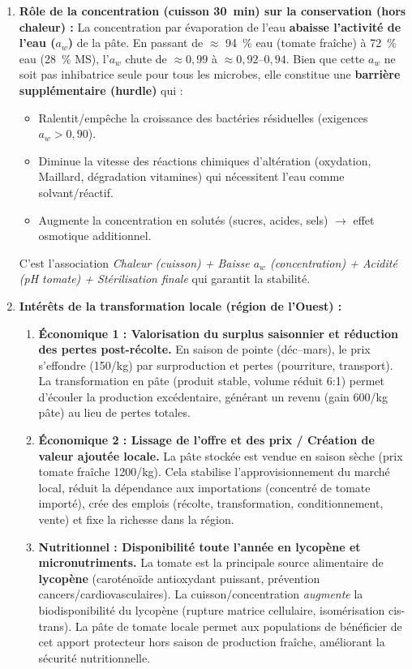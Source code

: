 \documentclass[11pt]{article}
\newcommand{\cle}[1]{{\popxbold\color{popdark}#1}}
\begin{document}
\begin{corrige}
\begin{enumerate}
\item \textbf{Rôle de la concentration (cuisson \SI{30}{\minute}) sur la conservation (hors chaleur) :}
La concentration par évaporation de l'eau \textbf{abaisse l'activité de l'eau ($a_w$)} de la pâte. En passant de $\approx$ \SI{94}{\%} eau (tomate fraîche) à \SI{72}{\%} eau (\SI{28}{\%} MS), l'$a_w$ chute de $\approx 0,99$ à $\approx 0,92\text{--}0,94$. Bien que cette $a_w$ ne soit pas inhibatrice seule pour tous les microbes, elle constitue une \textbf{barrière supplémentaire (hurdle)} qui :
\begin{itemize}
\item Ralentit/empêche la croissance des bactéries résiduelles (exigences $a_w > 0,90$).
\item Diminue la vitesse des réactions chimiques d'altération (oxydation, Maillard, dégradation vitamines) qui nécessitent l'eau comme solvant/réactif.
\item Augmente la concentration en solutés (sucres, acides, sels) $\to$ effet osmotique additionnel.
\end{itemize}
C'est l'association \emph{Chaleur (cuisson) + Baisse $a_w$ (concentration) + Acidité (pH tomate) + Stérilisation finale} qui garantit la stabilité.

\item \textbf{Intérêts de la transformation locale (région de l'Ouest) :}
\begin{enumerate}
\item \textbf{Économique 1 : Valorisation du surplus saisonnier et réduction des pertes post-récolte.} En saison de pointe (déc--mars), le prix s'effondre (\SI{150}{\FCFA}/\si{\kg}) par surproduction et pertes (pourriture, transport). La transformation en pâte (produit stable, volume réduit 6:1) permet d'écouler la production excédentaire, générant un revenu (gain \SI{600}{\FCFA}/\si{\kg} pâte) au lieu de pertes totales.
\item \textbf{Économique 2 : Lissage de l'offre et des prix / Création de valeur ajoutée locale.} La pâte stockée est vendue en saison sèche (prix tomate fraîche \SI{1200}{\FCFA}/\si{\kg}). Cela stabilise l'approvisionnement du marché local, réduit la dépendance aux importations (concentré de tomate importé), crée des emplois (récolte, transformation, conditionnement, vente) et fixe la richesse dans la région.
\item \textbf{Nutritionnel : Disponibilité toute l'année en \cle{lycopène} et micronutriments.} La tomate est la principale source alimentaire de \textbf{lycopène} (caroténoïde antioxydant puissant, prévention cancers/cardiovasculaires). La cuisson/concentration \emph{augmente} la biodisponibilité du lycopène (rupture matrice cellulaire, isomérisation cis-trans). La pâte de tomate locale permet aux populations de bénéficier de cet apport protecteur hors saison de production fraîche, améliorant la sécurité nutritionnelle.
\end{enumerate}
\end{enumerate}


\end{corrige}
\end{document}
